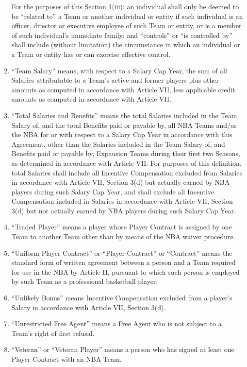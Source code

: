 \documentclass[
]{book}
\begin{document}
\begin{enumerate}
  For the purposes of this Section 1(iii): an individual shall only be deemed to be ``related to'' a Team or another individual or entity if such individual is an officer, director or executive employee of such Team or entity, or is a member of such individual's immediate family; and ``controls'' or ``is controlled by'' shall include (without limitation) the circumstance in which an individual or a Team or entity has or can exercise effective control.
\item
  ``Team Salary'' means, with respect to a Salary Cap Year, the sum of all Salaries attributable to a Team's active and former players plus other amounts as computed in accordance with Article VII, less applicable credit amounts as computed in accordance with Article VII.
\item
  ``Total Salaries and Benefits'' means the total Salaries included in the Team Salary of, and the total Benefits paid or payable by, all NBA Teams and/or the NBA for or with respect to a Salary Cap Year in accordance with this Agreement, other than the Salaries included in the Team Salary of, and Benefits paid or payable by, Expansion Teams during their first two Seasons, as determined in accordance with Article VII. For purposes of this definition, total Salaries shall include all Incentive Compensation excluded from Salaries in accordance with Article VII, Section 3(d) but actually earned by NBA players during such Salary Cap Year, and shall exclude all Incentive Compensation included in Salaries in accordance with Article VII, Section 3(d) but not actually earned by NBA players during such Salary Cap Year.
\item
  ``Traded Player'' means a player whose Player Contract is assigned by one Team to another Team other than by means of the NBA waiver procedure.
\item
  ``Uniform Player Contract'' or ``Player Contract'' or ``Contract'' means the standard form of written agreement between a person and a Team required for use in the NBA by Article II, pursuant to which such person is employed by such Team as a professional basketball player.
\item
  ``Unlikely Bonus'' means Incentive Compensation excluded from a player's Salary in accordance with Article VII, Section 3(d).
\item
  ``Unrestricted Free Agent'' means a Free Agent who is not subject to a Team's right of first refusal.
\item
  ``Veteran'' or ``Veteran Player'' means a person who has signed at least one Player Contract with an NBA Team.

\end{enumerate}
\end{document}
